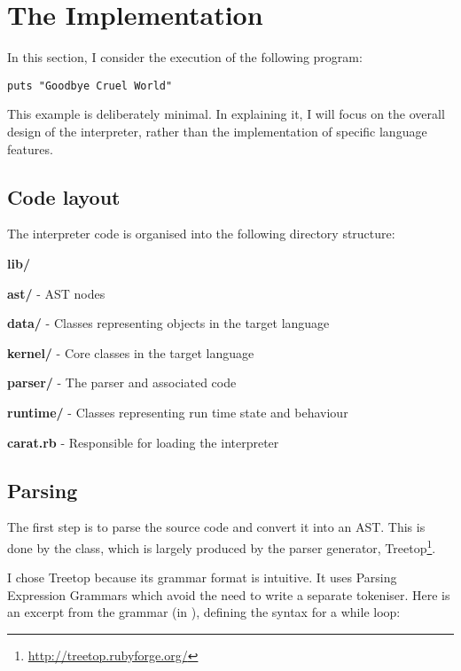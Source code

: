 \section{The Implementation}

In this section, I consider the execution of the following program:

\begin{lstlisting}
puts "Goodbye Cruel World"
\end{lstlisting}

This example is deliberately minimal. In explaining it, I will focus on the overall design of the interpreter, rather than the implementation of specific language features.

\subsection{Code layout}

The interpreter code is organised into the following directory structure:

\begin{dirlist}
  \item \textbf{lib/}
    \begin{dirlist}
      \item \textbf{ast/} - AST nodes
      \item \textbf{data/} - Classes representing objects in the target language
      \item \textbf{kernel/} - Core classes in the target language
      \item \textbf{parser/} - The parser and associated code
      \item \textbf{runtime/} - Classes representing run time state and behaviour
      \item \textbf{carat.rb} - Responsible for loading the interpreter
    \end{dirlist}
\end{dirlist}

\subsection{Parsing}

The first step is to parse the source code and convert it into an AST. This is done by the  class, which is largely produced by the parser generator, Treetop\footnote{\url{http://treetop.rubyforge.org/}}.

I chose Treetop because its grammar format is intuitive. It uses Parsing Expression Grammars which avoid the need to write a separate tokeniser. Here is an excerpt from the grammar (in ), defining the syntax for a while loop:

